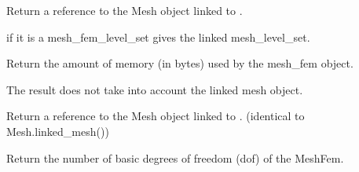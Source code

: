 \documentclass[a4paper,11pt,english]{sphinxmanual}
\begin{document}
\begin{fulllineitems}
\begin{fulllineitems}
\label{\detokenize{python/cmdref_MeshFem:getfem.MeshFem.linked_mesh}}
Return a reference to the Mesh object linked to .

\end{fulllineitems}


\begin{fulllineitems}
\label{\detokenize{python/cmdref_MeshFem:getfem.MeshFem.linked_mesh_levelset}}
if it is a mesh\_fem\_level\_set gives the linked mesh\_level\_set.

\end{fulllineitems}


\begin{fulllineitems}
\label{\detokenize{python/cmdref_MeshFem:getfem.MeshFem.memsize}}
Return the amount of memory (in bytes) used by the mesh\_fem object.

The result does not take into account the linked mesh object.

\end{fulllineitems}


\begin{fulllineitems}
\label{\detokenize{python/cmdref_MeshFem:getfem.MeshFem.mesh}}
Return a reference to the Mesh object linked to .
(identical to Mesh.linked\_mesh())

\end{fulllineitems}


\begin{fulllineitems}
\label{\detokenize{python/cmdref_MeshFem:getfem.MeshFem.nb_basic_dof}}
Return the number of basic degrees of freedom (dof) of the MeshFem.


\end{fulllineitems}
\end{fulllineitems}
\end{document}
